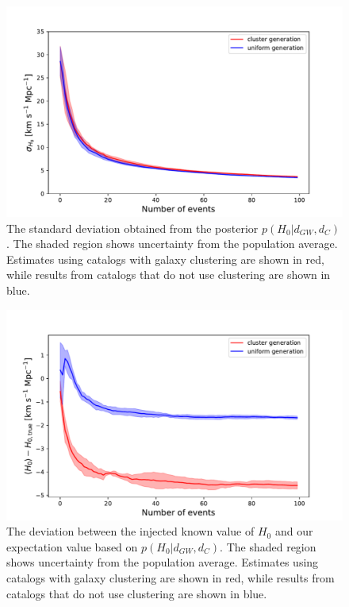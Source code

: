 \begin{figure}
    \centering
    \includegraphics[width=\columnwidth]{figures/std.pdf}
    \caption{The standard deviation obtained from the posterior $p(H_0 | d_{GW}, d_C)$. The shaded region shows uncertainty from the population average. Estimates using catalogs with galaxy clustering are shown in red, while results from catalogs that do not use clustering are shown in blue.}
    \label{fig:std}
\end{figure}

\begin{figure}
    \centering
    \includegraphics[width=\columnwidth]{figures/diff.pdf}
    \caption{The deviation between the injected known value of $H_0$ and our expectation value based on $p(H_0 | d_{GW}, d_C)$. The shaded region shows uncertainty from the population average. Estimates using catalogs with galaxy clustering are shown in red, while results from catalogs that do not use clustering are shown in blue.}
    \label{fig:mean_diff}
\end{figure}

